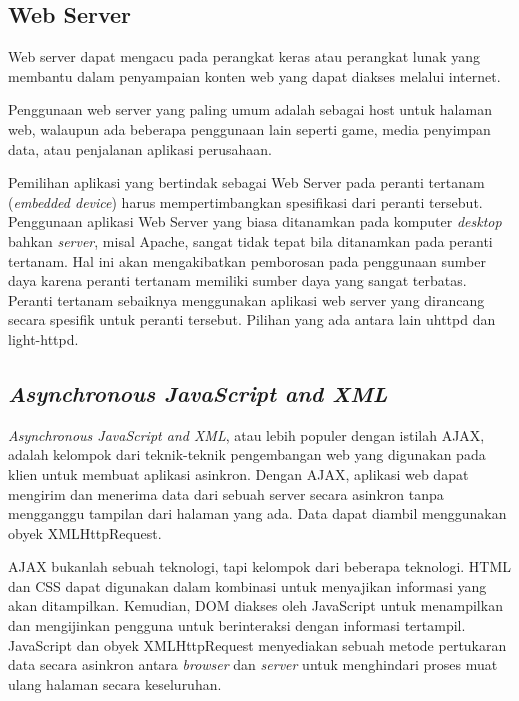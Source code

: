   \subsection{Web Server}
    Web server dapat mengacu pada perangkat keras atau perangkat lunak yang membantu dalam penyampaian konten web yang dapat diakses melalui internet.

    Penggunaan web server yang paling umum adalah sebagai host untuk halaman web, walaupun ada beberapa penggunaan lain seperti game, media penyimpan data, atau penjalanan aplikasi perusahaan.

    Pemilihan aplikasi yang bertindak sebagai Web Server pada peranti tertanam (\emph{embedded device}) harus mempertimbangkan spesifikasi dari peranti tersebut. Penggunaan aplikasi Web Server yang biasa ditanamkan pada komputer \emph{desktop} bahkan \emph{server}, misal Apache, sangat tidak tepat bila ditanamkan pada peranti tertanam. Hal ini akan mengakibatkan pemborosan pada penggunaan sumber daya karena peranti tertanam memiliki sumber daya yang sangat terbatas. Peranti tertanam sebaiknya menggunakan aplikasi web server yang dirancang secara spesifik untuk peranti tersebut. Pilihan yang ada antara lain uhttpd dan light-httpd.


  \subsection{\emph{Asynchronous JavaScript and XML}}
    \emph{Asynchronous JavaScript and XML}, atau lebih populer dengan istilah AJAX, adalah kelompok dari teknik-teknik pengembangan web yang digunakan pada klien untuk membuat aplikasi asinkron. Dengan AJAX, aplikasi web dapat mengirim dan menerima data dari sebuah server secara asinkron tanpa mengganggu tampilan dari halaman yang ada. Data dapat diambil menggunakan obyek XMLHttpRequest.

    AJAX bukanlah sebuah teknologi, tapi kelompok dari beberapa teknologi. HTML dan CSS dapat digunakan dalam kombinasi untuk menyajikan informasi yang akan ditampilkan. Kemudian, DOM diakses oleh JavaScript untuk menampilkan dan mengijinkan pengguna untuk berinteraksi dengan informasi tertampil. JavaScript dan obyek XMLHttpRequest menyediakan sebuah metode pertukaran data secara asinkron antara \emph{browser} dan \emph{server} untuk menghindari proses muat ulang halaman secara keseluruhan.


